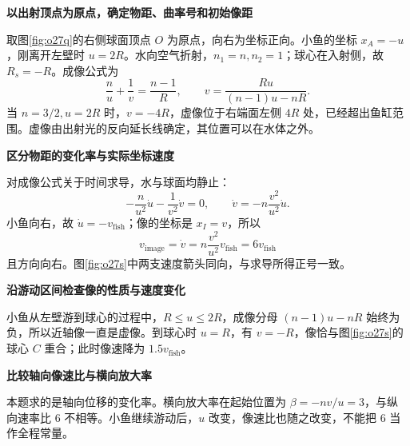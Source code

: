 \begin{solution}\textbf{以出射顶点为原点，确定物距、曲率号和初始像距}\par\nobreak
取图\ref{fig:o27q}的右侧球面顶点 \(O\) 为原点，向右为坐标正向。小鱼的坐标 \(x_A=-u\)，刚离开左壁时 \(u=2R\)。水向空气折射，\(n_1=n,n_2=1\)；球心在入射侧，故 \(R_{\!s}=-R\)。成像公式为
\[
 \frac nu+\frac1v=\frac{n-1}R,\qquad
 v=\frac{Ru}{(n-1)u-nR}.
\]
当 \(n=3/2,u=2R\) 时，\(v=-4R\)，虚像位于右端面左侧 \(4R\) 处，已经超出鱼缸范围。虚像由出射光的反向延长线确定，其位置可以在水体之外。



\par\medskip{}\noindent\textbf{区分物距的变化率与实际坐标速度}\par\nobreak
对成像公式关于时间求导，水与球面均静止：
\[
 -\frac n{u^2}\dot u-\frac1{v^2}\dot v=0,\qquad
 \dot v=-n\frac{v^2}{u^2}\dot u.
\]
小鱼向右，故 \(\dot u=-v_{\mathrm{fish}}\)；像的坐标是 \(x_I=v\)，所以
\[
 \boxed{v_{\mathrm{image}}=\dot v
 =n\frac{v^2}{u^2}v_{\mathrm{fish}}
 =6v_{\mathrm{fish}}}
\]
且方向向右。图\ref{fig:o27s}中两支速度箭头同向，与求导所得正号一致。



\par\medskip{}\noindent\textbf{沿游动区间检查像的性质与速度变化}\par\nobreak
小鱼从左壁游到球心的过程中，\(R\le u\le2R\)，成像分母 \((n-1)u-nR\) 始终为负，所以近轴像一直是虚像。到球心时 \(u=R\)，有 \(v=-R\)，像恰与图\ref{fig:o27s}的球心 \(C\) 重合；此时像速降为 \(1.5v_{\mathrm{fish}}\)。



\par\medskip{}\noindent\textbf{比较轴向像速比与横向放大率}\par\nobreak
本题求的是轴向位移的变化率。横向放大率在起始位置为
\(\beta=-nv/u=3\)，与纵向速率比 \(6\) 不相等。小鱼继续游动后，\(u\) 改变，像速比也随之改变，不能把 \(6\) 当作全程常量。
\end{solution}

